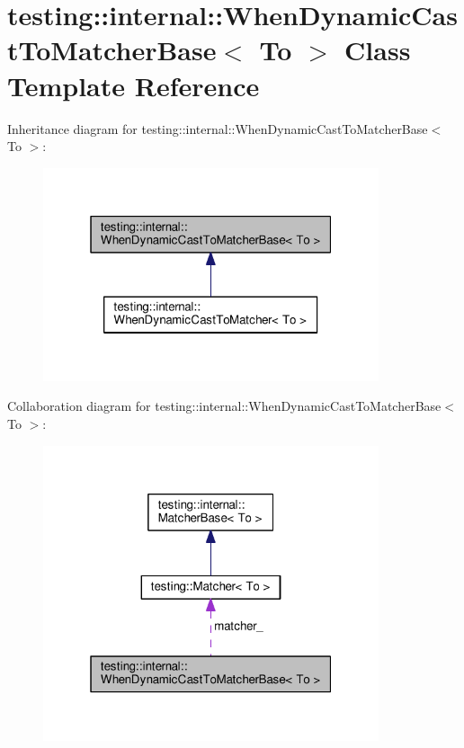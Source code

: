 \hypertarget{classtesting_1_1internal_1_1_when_dynamic_cast_to_matcher_base}{}\section{testing\+:\+:internal\+:\+:When\+Dynamic\+Cast\+To\+Matcher\+Base$<$ To $>$ Class Template Reference}
\label{classtesting_1_1internal_1_1_when_dynamic_cast_to_matcher_base}


Inheritance diagram for testing\+:\+:internal\+:\+:When\+Dynamic\+Cast\+To\+Matcher\+Base$<$ To $>$\+:
\nopagebreak
\begin{figure}[H]
\begin{center}
\leavevmode
\includegraphics[width=280pt]{classtesting_1_1internal_1_1_when_dynamic_cast_to_matcher_base__inherit__graph}
\end{center}
\end{figure}


Collaboration diagram for testing\+:\+:internal\+:\+:When\+Dynamic\+Cast\+To\+Matcher\+Base$<$ To $>$\+:
\nopagebreak
\begin{figure}[H]
\begin{center}
\leavevmode
\includegraphics[width=280pt]{classtesting_1_1internal_1_1_when_dynamic_cast_to_matcher_base__coll__graph}
\end{center}
\end{figure}
